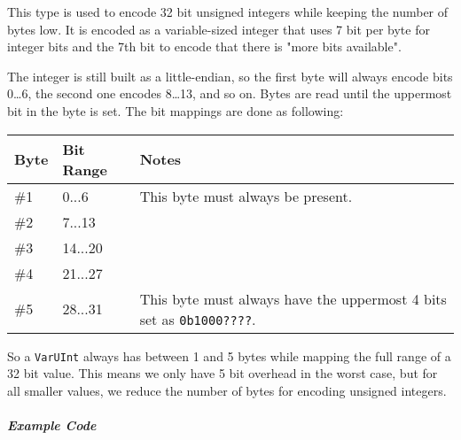 \documentclass[]{article}
\begin{document}
This type is used to encode 32 bit unsigned integers while keeping the
number of bytes low. It is encoded as a variable-sized integer that uses
7 bit per byte for integer bits and the 7th bit to encode that there is
"more bits available".

The integer is still built as a little-endian, so the first byte will
always encode bits 0\ldots6, the second one encodes 8\ldots13, and so
on. Bytes are read until the uppermost bit in the byte is set. The bit
mappings are done as following:

\begin{longtable}[]{@{}p{1in}p{1in}p{4in}@{}}
\toprule
Byte & Bit Range & Notes \\
\midrule
\endhead
\#1 & 0...6 & This byte must always be present. \\
\#2 & 7...13 & \\
\#3 & 14...20 & \\
\#4 & 21...27 & \\
\#5 & 28...31 & This byte must always have the uppermost 4 bits set as \texttt{0b1000????}. \\
\bottomrule
\end{longtable}

So a \texttt{VarUInt} always has between 1 and 5 bytes while mapping the
full range of a 32 bit value. This means we only have 5 bit overhead in
the worst case, but for all smaller values, we reduce the number of
bytes for encoding unsigned integers.

\hypertarget{example-code}{\subparagraph{Example Code}\label{example-code}}
\end{document}
